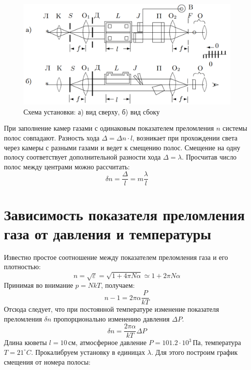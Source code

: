 \documentclass[12pt]{article}
\begin{document}
	\begin{figure}[h!]
		\begin{center}
			\includegraphics[width = \linewidth]{expsc}
			\caption{Схема установки: а) вид сверху, б) вид сбоку}
		\end{center}
	\end{figure}
	\newpage
	При заполнение камер газами с одинаковым показателем преломления $n$ системы полос совпадают. Разность хода $\Delta = \Delta n \cdot l$, возникает при прохождении света через камеры с разными газами и ведет к смещению полос. Смещение на одну полосу соответствует дополнительной разности хода $\Delta = \lambda$. Просчитав число полос между центрами можно рассчитать:
	\begin{equation}
	\delta n = \frac{\Delta}{l} = m\frac{\lambda}{l}
	\end{equation}
	
	\section{Зависимость показателя преломления газа от давления и температуры}
	Известно простое соотношение между показателем преломления газа и его плотностью:
	\begin{equation}
	n = \sqrt{\varepsilon} = \sqrt{1+4\pi N\alpha} \simeq 1 + 2\pi N \alpha
	\end{equation}
	Принимая во внимание $p = NkT$, получаем:
	\begin{equation}
	n - 1 = 2\pi\alpha\frac{P}{kT}
	\end{equation}
	Отсюда следует, что при постоянной температуре изменение показателя преломления $\delta n$ пропорционально изменению давления $\Delta P$.
	\begin{equation}
	\delta n = \frac{2\pi\alpha}{kT}\Delta P
	\end{equation}
	Длина кюветы $l = 10 \,\text{см}$, атмосферное давление $P = 101.2\cdot 10^3\,\text{Па}$, температура $T = 21 ^\circ C$. Прокалибруем установку в единицах $\lambda$. Для этого построим график смещения от номера полосы:\\
	
\end{document}
